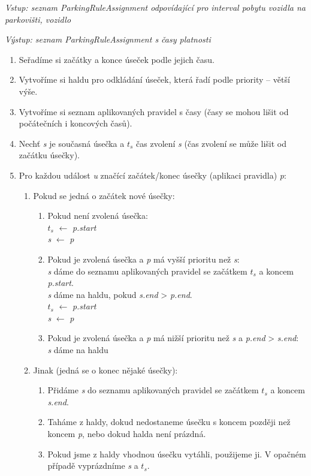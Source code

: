 \vspace{5mm}
\noindent
\textit{Vstup: seznam ParkingRuleAssignment odpovídající pro interval pobytu vozidla na parkovišti, vozidlo}

\noindent
\textit{Výstup: seznam ParkingRuleAssignment s časy platnosti}

\begin{enumerate}
  \setlength\itemsep{.05em}
  \item Seřadíme si začátky a konce úseček podle jejich času.
  \item Vytvoříme si haldu pro odkládání úseček, která řadí podle priority -- větší výše.
  \item Vytvoříme si seznam aplikovaných pravidel s časy (časy se mohou lišit od počátečních i koncových časů).
  \item Nechť \textit{s} je současná úsečka a \textit{$t_s$} čas zvolení \textit{s} (čas zvolení se může lišit od začátku úsečky).
  \item Pro každou událost \textit{u} značící začátek/konec úsečky (aplikaci pravidla) \textit{p}:
  \begin{enumerate}
    \item Pokud se jedná o začátek nové úsečky:
    \begin{enumerate}
      \item Pokud není zvolená úsečka:\\
            \textit{$t_s$} $\leftarrow$ \textit{p.start}\\
            \textit{s} $\leftarrow$ \textit{p}
      \item Pokud je zvolená úsečka a \textit{p} má vyšší prioritu než \textit{s}:\\
            \textit{s} dáme do seznamu aplikovaných pravidel se začátkem \textit{$t_s$} a koncem \textit{p.start}.\\
            \textit{s} dáme na haldu, pokud \textit{s.end} > \textit{p.end}.\\
            \textit{$t_s$} $\leftarrow$ \textit{p.start}\\
            \textit{s} $\leftarrow$ \textit{p}
      \item Pokud je zvolená úsečka a \textit{p} má nižší prioritu než \textit{s} a \textit{p.end} > \textit{s.end}:\\
            \textit{s} dáme na haldu
    \end{enumerate}
    \item Jinak (jedná se o konec nějaké úsečky):
    \begin{enumerate}
      \item Přidáme \textit{s} do seznamu aplikovaných pravidel se začátkem \textit{$t_s$} a koncem \textit{s.end}.
      \item Taháme z haldy, dokud nedostaneme úsečku s koncem později než koncem \textit{p}, nebo dokud halda není prázdná.
      \item Pokud jsme z haldy vhodnou úsečku vytáhli, použijeme ji. V opačném případě vyprázdníme \textit{s} a \textit{$t_s$}.
    \end{enumerate}
  \end{enumerate}
\end{enumerate}

